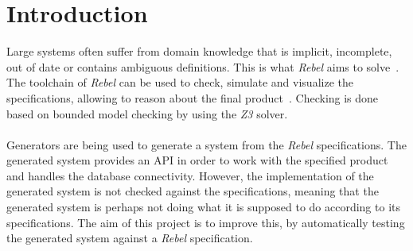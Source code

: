 \chapter{Introduction}
\label{chp:intro}
Large systems often suffer from domain knowledge that is implicit, incomplete,
out of date or contains ambiguous definitions. This is what \textit{Rebel} aims
to solve~\cite{stoel2016solving}. The toolchain of \textit{Rebel} can be used to
check, simulate and visualize the specifications, allowing to reason about the
final product~\cite{stoel2015case}. Checking is done based on bounded model checking
by using the \textit{Z3} solver.\\
\\
Generators are being used to generate a system from the \textit{Rebel}
specifications. The generated system provides an API in order to work with the
specified product and handles the database connectivity. However, the
implementation of the generated system is not checked against the
specifications, meaning that the generated system is perhaps not doing what it
is supposed to do according to its specifications. The aim of this project is to
improve this, by automatically testing the generated system against a
\textit{Rebel} specification.

